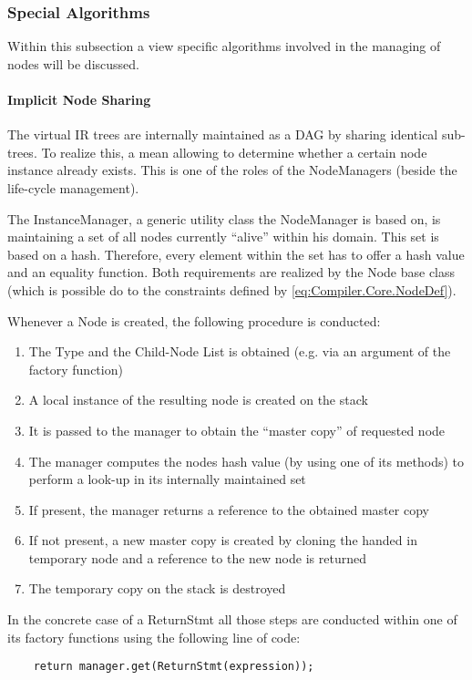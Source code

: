\subsubsection{Special Algorithms}
Within this subsection a view specific algorithms involved in the managing of
nodes will be discussed. 

\paragraph{Implicit Node Sharing} 
The virtual IR trees are internally maintained as a DAG by sharing identical
sub-trees. To realize this, a mean allowing to determine whether a certain node
instance already exists. This is one of the roles of the NodeManagers (beside
the life-cycle management).

The InstanceManager, a generic utility class the NodeManager is based on, is
maintaining a set of all nodes currently ``alive'' within his domain. This set
is based on a hash. Therefore, every element within the set has to offer a hash
value and an equality function. Both requirements are realized by the Node base
class (which is possible do to the constraints defined by
\ref{eq:Compiler.Core.NodeDef}).

Whenever a Node is created, the following procedure is conducted:
\begin{enumerate}
  \item The Type and the Child-Node List is obtained (e.g. via an argument of
  the factory function)
  \item A local instance of the resulting node is created on the stack
  \item It is passed to the manager to obtain the ``master copy'' of
  requested node
  \item The manager computes the nodes hash value (by using one of its methods)
  to perform a look-up in its internally maintained set
  \item If present, the manager returns a reference to the obtained master copy
  \item If not present, a new master copy is created by cloning the handed in
  temporary node and a reference to the new node is returned
  \item The temporary copy on the stack is destroyed 
\end{enumerate}

In the concrete case of a ReturnStmt all those steps are conducted within one of
its factory functions using the following line of code:
\begin{lstlisting}
	return manager.get(ReturnStmt(expression));
\end{lstlisting}

